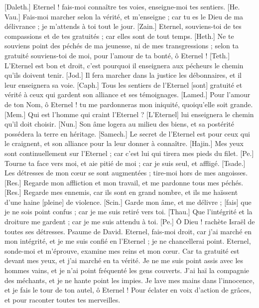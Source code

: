\begin{multicols}{2}
[Daleth.] Eternel ! fais-moi connaître tes voies, enseigne-moi tes sentiers.
[He. Vau.] Fais-moi marcher selon la vérité, et m'enseigne ; car tu es le Dieu de ma délivrance ; je m'attends à toi tout le jour.
[Zain.] Eternel, souviens-toi de tes compassions et de tes gratuités ; car elles sont de tout temps.
[Heth.] Ne te souviens point des péchés de ma jeunesse, ni de mes transgressions ; selon ta gratuité souviens-toi de moi, pour l'amour de ta bonté, ô Eternel !
[Teth.] L’Eternel est bon et droit, c'est pourquoi il enseignera aux pécheurs le chemin qu'ils doivent tenir.
[Jod.] Il fera marcher dans la justice les débonnaires, et il leur enseignera sa voie.
[Caph.] Tous les sentiers de l'Eternel [sont] gratuité et vérité à ceux qui gardent son alliance et ses témoignages.
[Lamed.] Pour l'amour de ton Nom, ô Eternel ! tu me pardonneras mon iniquité, quoiqu'elle soit grande.
[Mem.] Qui est l'homme qui craint l'Eternel ? [L'Eternel] lui enseignera le chemin qu'il doit choisir.
[Nun.] Son âme logera au milieu des biens, et sa postérité possédera la terre en héritage.
[Samech.] Le secret de l'Eternel est pour ceux qui le craignent, et son alliance pour la leur donner à connaître.
[Hajin.] Mes yeux sont continuellement sur l'Eternel ; car c'est lui qui tirera mes pieds du filet.
[Pe.] Tourne ta face vers moi, et aie pitié de moi ; car je suis seul, et affligé.
[Tsade.] Les détresses de mon cœur se sont augmentées ; tire-moi hors de mes angoisses.
[Res.] Regarde mon affliction et mon travail, et me pardonne tous mes péchés.
[Res.] Regarde mes ennemis, car ils sont en grand nombre, et ils me haïssent d'une haine [pleine] de violence.
[Scin.] Garde mon âme, et me délivre ; [fais] que je ne sois point confus ; car je me suis retiré vers toi.
[Thau.] Que l'intégrité et la droiture me gardent ; car je me suis attendu à toi.
[Pe.] Ô Dieu ! rachète Israël de toutes ses détresses.
\VerseOne{}Psaume de David. Eternel, fais-moi droit, car j'ai marché en mon intégrité, et je me suis confié en l'Eternel ; je ne chancellerai point.
Eternel, sonde-moi et m'éprouve, examine mes reins et mon cœur.
Car ta gratuité est devant mes yeux, et j'ai marché en ta vérité.
Je ne me suis point assis avec les hommes vains, et je n'ai point fréquenté les gens couverts.
J'ai haï la compagnie des méchants, et je ne hante point les impies.
Je lave mes mains dans l'innocence, et je fais le tour de ton autel, ô Eternel !
Pour éclater en voix d'action de grâces, et pour raconter toutes tes merveilles.

\end{multicols}
